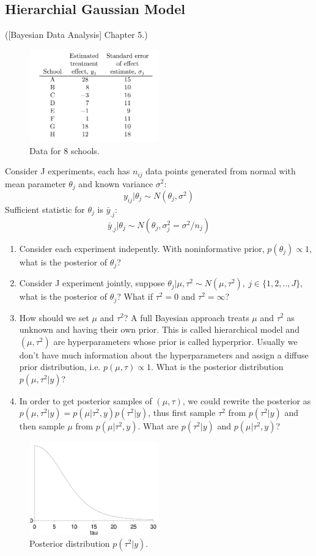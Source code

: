 \documentclass{harvardml}
\theoremstyle{definition}
\theoremstyle{plain}
\begin{document}
\subsection{Hierarchial Gaussian Model}
([Bayesian Data Analysis] Chapter 5.) 
\begin{figure}
\center
\includegraphics[width=0.5\textwidth]{8school_data.pdf}
\caption{Data for 8 schools.}
\end{figure}
Consider J experiments, each has $n_{ij}$ data points generated from normal with mean parameter $\theta_j$ and known variance $\sigma^2$:
$$y_{ij}|\theta_j \sim N(\theta_j, \sigma^2)$$
Sufficient statistic for $\theta_j$ is $\bar y_{.j}$: $$\bar y_{.j}|\theta_j \sim N(\theta_j, \sigma^2_j = \sigma^2/n_j)$$
\begin{enumerate}
\item Consider each experiment indepently. With noninformative prior, $p(\theta_j) \propto 1$, what is the posterior of $\theta_j$?
\item Consider J experiment jointly, suppose $\theta_j|\mu, \tau^2 \sim N(\mu, \tau^2),\ j \in \{1,2,..,J\}$, what is the posterior of $\theta_j$? What if $\tau^2 = 0 $ and $\tau^2 = \infty$?
\item How should we set $\mu$ and $\tau^2$? A full Bayesian approach treats $\mu$ and $\tau^2$ as unknown and having their own prior. This is called hierarchical model and $(\mu, \tau^2)$ are hyperparameters whose prior is called hyperprior. Usually we don't have much information about the hyperparameters and assign a diffuse prior distribution, i.e. $p(\mu, \tau) \propto 1$. What is the posterior distribution $p(\mu, \tau^2|y)$? 
\item In order to get posterior samples of $(\mu, \tau)$, we could rewrite the posterior as $p(\mu, \tau^2|y) = p(\mu|\tau^2, y)p(\tau^2|y)$, thus first sample $\tau^2$ from  $p(\tau^2|y)$ and then sample $\mu$ from $ p(\mu|\tau^2, y)$. What are $p(\tau^2|y)$ and $ p(\mu|\tau^2, y)$?
\end{enumerate}
\begin{figure}[!hbt]
\center
\includegraphics[width=0.5\textwidth]{8school_post_tau.pdf}
\caption{Posterior distribution $p(\tau^2|y)$.}
\end{figure}
\end{document}
